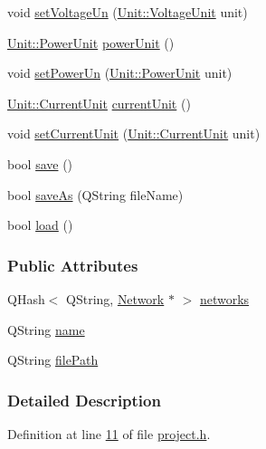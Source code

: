 \begin{DoxyCompactItemize}
void \hyperlink{class_project_aa26b488b2e93c8a8c6b4423ce07df4a1}{set\+Voltage\+Un} (\hyperlink{class_unit_a55b07dfa9457e1eca2c7194fe0cfc3c1}{Unit\+::\+Voltage\+Unit} unit)
\item 
\hyperlink{class_unit_ace265ae255370ccacfd5370337572c3b}{Unit\+::\+Power\+Unit} \hyperlink{class_project_a2a1bc35358d6189695d6e5b7dd547ffd}{power\+Unit} ()
\item 
void \hyperlink{class_project_aa46b8645d2047c1a2e8d329b9ebbc120}{set\+Power\+Un} (\hyperlink{class_unit_ace265ae255370ccacfd5370337572c3b}{Unit\+::\+Power\+Unit} unit)
\item 
\hyperlink{class_unit_a0794cf6c9682f48296dd4a5315389787}{Unit\+::\+Current\+Unit} \hyperlink{class_project_a0d22341fcc068be743b776df0a02f55e}{current\+Unit} ()
\item 
void \hyperlink{class_project_a64d9800bc3acafcfa4d3f45ee5aacc6d}{set\+Current\+Unit} (\hyperlink{class_unit_a0794cf6c9682f48296dd4a5315389787}{Unit\+::\+Current\+Unit} unit)
\item 
bool \hyperlink{class_project_a596a875bc5be73bc5b1b71b6448c1e07}{save} ()
\item 
bool \hyperlink{class_project_ad32a31d548ad38f4cbbe0f95879a68e5}{save\+As} (Q\+String file\+Name)
\item 
bool \hyperlink{class_project_a1e373892a0383371132ce68fa5f8813d}{load} ()
\end{DoxyCompactItemize}
\subsubsection*{Public Attributes}
\begin{DoxyCompactItemize}
\item 
Q\+Hash$<$ Q\+String, \hyperlink{class_network}{Network} $\ast$ $>$ \hyperlink{class_project_aa98126154cab59769a431668e6f17daf}{networks}
\item 
Q\+String \hyperlink{class_project_a82dd2d1bc38f9fd08c9a811fcaa76b38}{name}
\item 
Q\+String \hyperlink{class_project_a79f30adcefd0b72bd4ac7db724bc9531}{file\+Path}
\end{DoxyCompactItemize}


\subsubsection{Detailed Description}


Definition at line \hyperlink{project_8h_source_l00011}{11} of file \hyperlink{project_8h_source}{project.\+h}.



